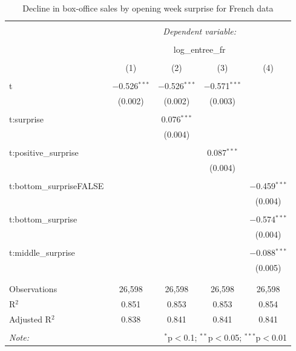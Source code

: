 \begin{table}[H] \centering 
	\caption{Decline in box-office sales by opening week surprise for French data} 
	\label{} 
	\begin{tabular}{@{\extracolsep{5pt}}lcccc} 
		\\[-1.8ex]\hline 
		\hline \\[-1.8ex] 
		& \multicolumn{4}{c}{\textit{Dependent variable:}} \\ 
		\cline{2-5} 
		\\[-1.8ex] & \multicolumn{4}{c}{log\_entree\_fr} \\ 
		\\[-1.8ex] & (1) & (2) & (3) & (4)\\ 
		\hline \\[-1.8ex] 
		t & $-$0.526$^{***}$ & $-$0.526$^{***}$ & $-$0.571$^{***}$ &  \\ 
		& (0.002) & (0.002) & (0.003) &  \\ 
		& & & & \\ 
		t:surprise &  & 0.076$^{***}$ &  &  \\ 
		&  & (0.004) &  &  \\ 
		& & & & \\ 
		t:positive\_surprise &  &  & 0.087$^{***}$ &  \\ 
		&  &  & (0.004) &  \\ 
		& & & & \\ 
		t:bottom\_surpriseFALSE &  &  &  & $-$0.459$^{***}$ \\ 
		&  &  &  & (0.004) \\ 
		& & & & \\ 
		t:bottom\_surprise &  &  &  & $-$0.574$^{***}$ \\ 
		&  &  &  & (0.004) \\ 
		& & & & \\ 
		t:middle\_surprise &  &  &  & $-$0.088$^{***}$ \\ 
		&  &  &  & (0.005) \\ 
		& & & & \\ 
		\hline \\[-1.8ex] 
		Observations & 26,598 & 26,598 & 26,598 & 26,598 \\ 
		R$^{2}$ & 0.851 & 0.853 & 0.853 & 0.854 \\ 
		Adjusted R$^{2}$ & 0.838 & 0.841 & 0.841 & 0.841 \\ 
		\hline 
		\hline \\[-1.8ex] 
		\textit{Note:}  & \multicolumn{4}{r}{$^{*}$p$<$0.1; $^{**}$p$<$0.05; $^{***}$p$<$0.01} \\ 
	\end{tabular} 
\end{table} 
